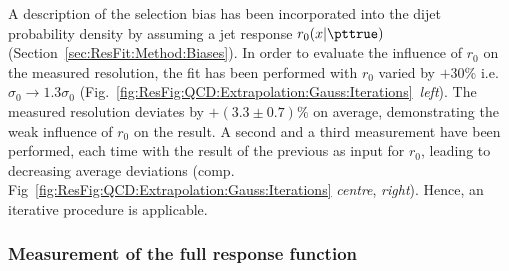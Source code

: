 A description of the selection bias has been incorporated into the dijet probability density by assuming a jet \pt response $r_{0}(x|\pttrue)$ (Section~\ref{sec:ResFit:Method:Biases}).
In order to evaluate the influence of $r_{0}$ on the measured resolution, the fit has been performed with $r_{0}$ varied by $+30\%$ i.e. $\sigma_{0}\rightarrow 1.3\sigma_{0}$ (Fig.~\ref{fig:ResFig:QCD:Extrapolation:Gauss:Iterations}~\textit{left}).
The measured resolution deviates by $+(3.3 \pm 0.7)\%$ on average, demonstrating the weak influence of $r_{0}$ on the result.
A second and a third measurement have been performed, each time with the result of the previous as input for $r_{0}$, leading to decreasing average deviations (comp. Fig~\ref{fig:ResFig:QCD:Extrapolation:Gauss:Iterations} \textit{centre}, \textit{right}).
Hence, an iterative procedure is applicable. 



\subsubsection{Measurement of the full response function}\label{sec:ResFit:QCDMC:CrystalBall}

